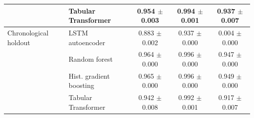\begin{tabular}{llccc}
 & Tabular Transformer & 0.954 $\pm$ 0.003 & 0.994 $\pm$ 0.001 & 0.937 $\pm$ 0.007 \\
\midrule
Chronological holdout & LSTM autoencoder & 0.883 $\pm$ 0.002 & 0.937 $\pm$ 0.000 & 0.004 $\pm$ 0.000 \\
 & Random forest & 0.964 $\pm$ 0.000 & 0.996 $\pm$ 0.000 & 0.947 $\pm$ 0.000 \\
 & Hist. gradient boosting & 0.965 $\pm$ 0.000 & 0.996 $\pm$ 0.000 & 0.949 $\pm$ 0.000 \\
 & Tabular Transformer & 0.942 $\pm$ 0.008 & 0.992 $\pm$ 0.001 & 0.917 $\pm$ 0.007 \\
\bottomrule
\end{tabular}
